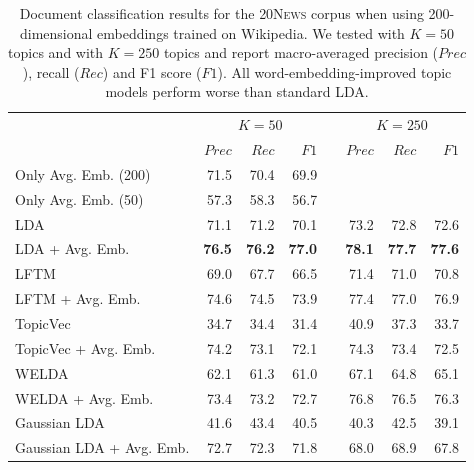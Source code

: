 \documentclass[
        a4paper,
        titlepage,
        twoside,
        parskip,
        numbers=noenddot
        ]{scrbook}
\newcommand{\ra}[1]{\renewcommand{\arraystretch}{#1}}
\theoremstyle{break}
\begin{document}
\begin{table}[]
  \ra{1.3}
  \centering
  \caption{Document classification results for the \textsc{20News} corpus when using 200-dimensional embeddings trained on Wikipedia.
  We tested with $K = 50$ topics and with $K = 250$ topics and report macro-averaged precision ($Prec$), recall ($Rec$) and F1 score ($F1$).
  All word-embedding-improved topic models perform worse than standard LDA.}
  \label{table:document_classification_dim-200}
  \begin{tabular}{lrrrcrrr}
    \toprule
    \multirow{2}{*}{} & \multicolumn{3}{c}{$K = 50$} & \phantom{a} & \multicolumn{3}{c}{$K = 250$} \\ \cmidrule{2-4} \cmidrule{6-8}
                      & $Prec$    & $Rec$     & $F1$     && $Prec$    & $Rec$   & $F1$     \\ \midrule
                      Only Avg. Emb. (200)     & 71.5    & 70.4    & 69.9   && \multicolumn{3}{l}{}        \\
                      Only Avg. Emb. (50)      & 57.3    & 58.3    & 56.7   && \multicolumn{3}{l}{}        \\
                      LDA                      & 71.1    & 71.2    & 70.1   && 73.2    & 72.8     & 72.6   \\
                      LDA + Avg. Emb.          & \textbf{76.5}    & \textbf{76.2}    & \textbf{77.0}   && \textbf{78.1}    & \textbf{77.7}     & \textbf{77.6}   \\
                      LFTM                     & 69.0    & 67.7    & 66.5   && 71.4    & 71.0     & 70.8   \\
                      LFTM + Avg. Emb.         & 74.6    & 74.5    & 73.9   && 77.4    & 77.0     & 76.9   \\
                      TopicVec                 & 34.7    & 34.4    & 31.4   && 40.9    & 37.3     & 33.7   \\
                      TopicVec + Avg. Emb.     & 74.2    & 73.1    & 72.1   && 74.3    & 73.4     & 72.5   \\
                      WELDA                    & 62.1    & 61.3    & 61.0   && 67.1    & 64.8     & 65.1   \\
                      WELDA + Avg. Emb.        & 73.4    & 73.2    & 72.7   && 76.8    & 76.5     & 76.3   \\
                      Gaussian LDA             & 41.6    & 43.4    & 40.5   && 40.3    & 42.5     & 39.1   \\
                      Gaussian LDA + Avg. Emb. & 72.7    & 72.3    & 71.8   && 68.0    & 68.9     & 67.8   \\
  \bottomrule
  \end{tabular}
\end{table}
\end{document}

